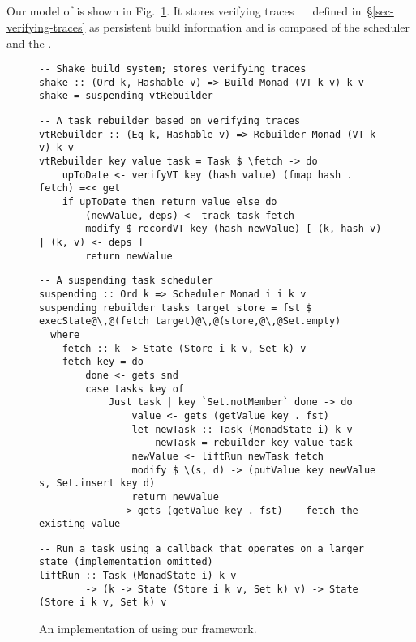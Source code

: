 \subsection{\Shake}\label{sec-implementation-shake}

Our model of \Shake is shown in Fig.~\ref{fig-shake-implementation}. It stores
verifying traces ~~ defined in~\S\ref{sec-verifying-traces}
as persistent build information and is composed of the  scheduler
and the .

\begin{figure}
\begin{verbatim}
-- Shake build system; stores verifying traces
shake :: (Ord k, Hashable v) => Build Monad (VT k v) k v
shake = suspending vtRebuilder
\end{verbatim}
\vspace{1mm}
\begin{verbatim}
-- A task rebuilder based on verifying traces
vtRebuilder :: (Eq k, Hashable v) => Rebuilder Monad (VT k v) k v
vtRebuilder key value task = Task $ \fetch -> do
    upToDate <- verifyVT key (hash value) (fmap hash . fetch) =<< get
    if upToDate then return value else do
        (newValue, deps) <- track task fetch
        modify $ recordVT key (hash newValue) [ (k, hash v) | (k, v) <- deps ]
        return newValue
\end{verbatim}
\vspace{1mm}
\begin{verbatim}
-- A suspending task scheduler
suspending :: Ord k => Scheduler Monad i i k v
suspending rebuilder tasks target store = fst $ execState@\,@(fetch target)@\,@(store,@\,@Set.empty)
  where
    fetch :: k -> State (Store i k v, Set k) v
    fetch key = do
        done <- gets snd
        case tasks key of
            Just task | key `Set.notMember` done -> do
                value <- gets (getValue key . fst)
                let newTask :: Task (MonadState i) k v
                    newTask = rebuilder key value task
                newValue <- liftRun newTask fetch
                modify $ \(s, d) -> (putValue key newValue s, Set.insert key d)
                return newValue
            _ -> gets (getValue key . fst) -- fetch the existing value
\end{verbatim}
\vspace{1mm}
\begin{verbatim}
-- Run a task using a callback that operates on a larger state (implementation omitted)
liftRun :: Task (MonadState i) k v
        -> (k -> State (Store i k v, Set k) v) -> State (Store i k v, Set k) v
\end{verbatim}
\vspace{-1mm}
\caption{An implementation of \Shake using our framework.}\label{fig-shake-implementation}
\vspace{-3mm}
\end{figure}

